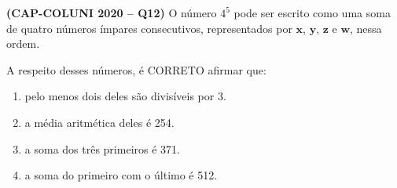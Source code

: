 \textbf{(CAP-COLUNI 2020 -- Q12)} O número $4^5$ pode ser escrito como uma soma de quatro números ímpares consecutivos, representados por $\mathbf{x}$, $\mathbf{y}$, $\mathbf{z}$ e $\mathbf{w}$, nessa ordem.

A respeito desses números, é CORRETO afirmar que:

\begin{enumerate}
	\item pelo menos dois deles são divisíveis por 3.
	\item a média aritmética deles é 254.
	\item a soma dos três primeiros é 371.
	\item a soma do primeiro com o último é 512.
\end{enumerate}
